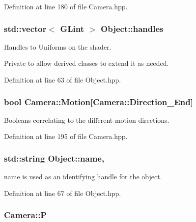 Definition at line 180 of file Camera.\-hpp.

\hypertarget{class_object_acd6c7021617ea334915a1525f9519bc5}{
\subsubsection[{handles}]{\setlength{\rightskip}{0pt plus 5cm}std\-::vector$<$ G\-Lint $>$ Object\-::handles\hspace{0.3cm}{\ttfamily [inherited]}}}\label{class_object_acd6c7021617ea334915a1525f9519bc5}


Handles to Uniforms on the shader. 

Private to allow derived classes to extend it as needed. 

Definition at line 63 of file Object.\-hpp.

\hypertarget{class_camera_a16f01b362cb7c18d203e468bf5483749}{
\subsubsection[{Motion}]{\setlength{\rightskip}{0pt plus 5cm}bool Camera\-::\-Motion\mbox{[}Camera\-::\-Direction\-\_\-\-End\mbox{]}\hspace{0.3cm}{\ttfamily [private]}}}\label{class_camera_a16f01b362cb7c18d203e468bf5483749}


Booleans correlating to the different motion directions. 



Definition at line 195 of file Camera.\-hpp.

\hypertarget{class_object_a24457e0a387492c80594aec7681a2277}{
\subsubsection[{name}]{\setlength{\rightskip}{0pt plus 5cm}std\-::string Object\-::name\hspace{0.3cm}{\ttfamily [protected]}, {\ttfamily [inherited]}}}\label{class_object_a24457e0a387492c80594aec7681a2277}


name is used as an identifying handle for the object. 



Definition at line 67 of file Object.\-hpp.

\hypertarget{class_camera_a0bee6fbae6ec5960850a5fb858f3912a}{
\subsubsection[{P}]{ Camera\-::\-P\hspace{0.3cm}{\ttfamily [private]}}}\label{class_camera_a0bee6fbae6ec5960850a5fb858f3912a}


